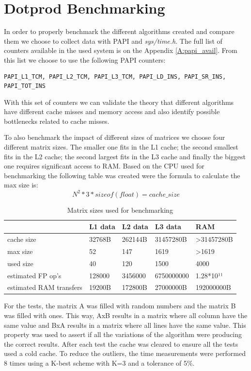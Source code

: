 \documentclass[a4paper]{report}
\begin{document}
\chapter{Dotprod Benchmarking}
In order to properly benchmark the different algorithms created and compare them
we choose to collect data with PAPI and \textit{sys/time.h}. The full list of
counters available in the used system is on the Appendix \ref{A:papi_avail}. From
this list we choose to use the following PAPI counters:
\begin{verbatim}
PAPI_L1_TCM, PAPI_L2_TCM, PAPI_L3_TCM, PAPI_LD_INS, PAPI_SR_INS, PAPI_TOT_INS
\end{verbatim}

With this set of counters we can validate the theory that different algorithms
have different cache misses and memory access and also identify possible
bottlenecks related to cache misses.

To also benchmark the impact of different sizes of matrices we choose four
different matrix sizes. The smaller one fits in the L1 cache; the second
smallest fits in the L2 cache; the second largest fits in the L3 cache and
finally the biggest one requires significant access to RAM. Based on the CPU
used for benchmarking the following table was created were the formula to
calculate the max size is: \[N^2*3*sizeof(float) = cache\_size\]

\begin{table}[H]
\centering
\begin{tabular}{|l|l|l|l|l|}
\hline
           & L1 data & L2 data & L3 data  & RAM                        \\ \hline
cache size & 32768B   & 262144B  & 31457280B & \textgreater{}31457280B \\ \hline
max size   & 52      & 147     & 1619     & \textgreater{}1619         \\ \hline
used size  & 40      & 120     & 1500     & 4000                       \\ \hline
estimated FP op's & 128000  & 3456000 & 6750000000 & 1.28*10¹¹         \\ \hline
estimated RAM transfers & 19200B  & 172800B & 27000000B & 192000000B   \\ \hline
\end{tabular}
\caption{Matrix sizes used for benchmarking}
\end{table}

For the tests, the matrix A was filled with random numbers and the matrix B was
filled with ones. This way, AxB results in a matrix where all column have the
same value and BxA results in a matrix where all lines have the same value. This
property was used to assert if all the variations of the algorithm were producing
the correct results. After each test the cache was cleared to ensure all the
tests used a cold cache. To reduce the outliers, the time measurements were
performed 8 times using a K-best scheme with K=3 and a tolerance of 5\%.
\end{document}
